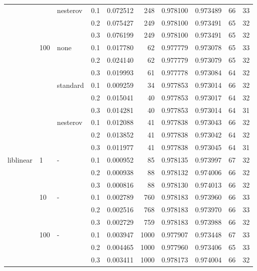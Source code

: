 \begin{table}[H]
\begin{tabular}{llllrrrrrr}
          &     & nesterov & 0.1 &  0.072512 &     248 &  0.978100 &  0.973489 &          66 &        33 \\
          &     &   & 0.2 &  0.075427 &     249 &  0.978100 &  0.973491 &          65 &        32 \\
          &     &   & 0.3 &  0.076199 &     249 &  0.978100 &  0.973491 &          65 &        32 \\
          & 100 & none & 0.1 &  0.017780 &      62 &  0.977779 &  0.973078 &          65 &        33 \\
          &     &   & 0.2 &  0.024140 &      62 &  0.977779 &  0.973079 &          65 &        32 \\
          &     &   & 0.3 &  0.019993 &      61 &  0.977778 &  0.973084 &          64 &        32 \\
          &     & standard & 0.1 &  0.009259 &      34 &  0.977853 &  0.973014 &          66 &        32 \\
          &     &   & 0.2 &  0.015041 &      40 &  0.977853 &  0.973017 &          64 &        32 \\
          &     &   & 0.3 &  0.014281 &      40 &  0.977853 &  0.973014 &          64 &        31 \\
          &     & nesterov & 0.1 &  0.012088 &      41 &  0.977838 &  0.973043 &          66 &        32 \\
          &     &   & 0.2 &  0.013852 &      41 &  0.977838 &  0.973042 &          64 &        32 \\
          &     &   & 0.3 &  0.011977 &      41 &  0.977838 &  0.973045 &          64 &        31 \\
liblinear & 1   & - & 0.1 &  0.000952 &      85 &  0.978135 &  0.973997 &          67 &        32 \\
          &     &   & 0.2 &  0.000938 &      88 &  0.978132 &  0.974006 &          66 &        32 \\
          &     &   & 0.3 &  0.000816 &      88 &  0.978130 &  0.974013 &          66 &        32 \\
          & 10  & - & 0.1 &  0.002789 &     760 &  0.978183 &  0.973960 &          66 &        33 \\
          &     &   & 0.2 &  0.002516 &     768 &  0.978183 &  0.973970 &          66 &        33 \\
          &     &   & 0.3 &  0.002729 &     759 &  0.978183 &  0.973988 &          66 &        32 \\
          & 100 & - & 0.1 &  0.003947 &    1000 &  0.977907 &  0.973448 &          67 &        33 \\
          &     &   & 0.2 &  0.004465 &    1000 &  0.977960 &  0.973406 &          65 &        33 \\
          &     &   & 0.3 &  0.003411 &    1000 &  0.978173 &  0.974004 &          66 &        32 \\
\bottomrule
\end{tabular}
\end{table}
